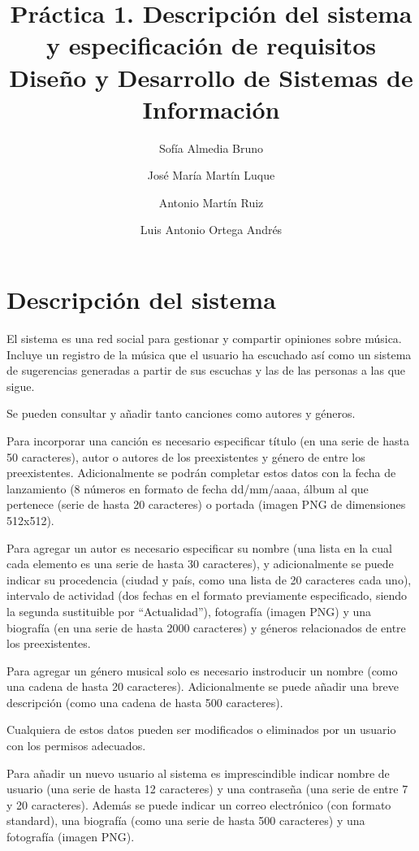 \documentclass[11pt,a4paper]{article}
\title{Práctica 1. Descripción del sistema y especificación de requisitos \large Diseño y Desarrollo de Sistemas de Información}
\author{Sofía Almedia Bruno \and José María Martín Luque \and Antonio Martín Ruiz \and Luis Antonio Ortega Andrés}
\begin{document}
\maketitle

\section{Descripción del sistema} %
\label{sec:descripcion_del_sistema}
El sistema es una red social para gestionar y compartir opiniones sobre música. Incluye un registro de la música que el usuario ha escuchado así como un sistema de sugerencias generadas a partir de sus escuchas y las de las personas a las que sigue.

Se pueden consultar y añadir tanto canciones como autores y géneros. 

Para incorporar una canción es necesario especificar título (en una serie de hasta 50 caracteres), autor o autores de los preexistentes y género de entre los preexistentes. Adicionalmente se podrán completar estos datos con la fecha de lanzamiento (8 números en formato de fecha dd/mm/aaaa, álbum al que pertenece (serie de hasta 20 caracteres) o portada (imagen PNG de dimensiones 512x512).

Para agregar un autor es necesario especificar su nombre (una lista en la cual cada elemento es una serie de hasta 30 caracteres), y adicionalmente se puede indicar su procedencia (ciudad y país, como una lista de 20 caracteres cada uno), intervalo de actividad (dos fechas en el formato previamente especificado, siendo la segunda sustituible por ``Actualidad''), fotografía (imagen PNG) y una biografía (en una serie de hasta 2000 caracteres) y géneros relacionados de entre los preexistentes.

Para agregar un género musical solo es necesario instroducir un nombre (como una cadena de hasta 20 caracteres). Adicionalmente se puede añadir una breve descripción (como una cadena de hasta 500 caracteres).

Cualquiera de estos datos pueden ser modificados o eliminados por un usuario con los permisos adecuados.


Para añadir un nuevo usuario al sistema es imprescindible indicar nombre de usuario (una serie de hasta 12 caracteres) y una contraseña (una serie de entre 7 y 20 caracteres). Además se puede indicar un correo electrónico (con formato standard), una biografía (como una serie de hasta 500 caracteres) y una fotografía (imagen PNG). 
\end{document}
